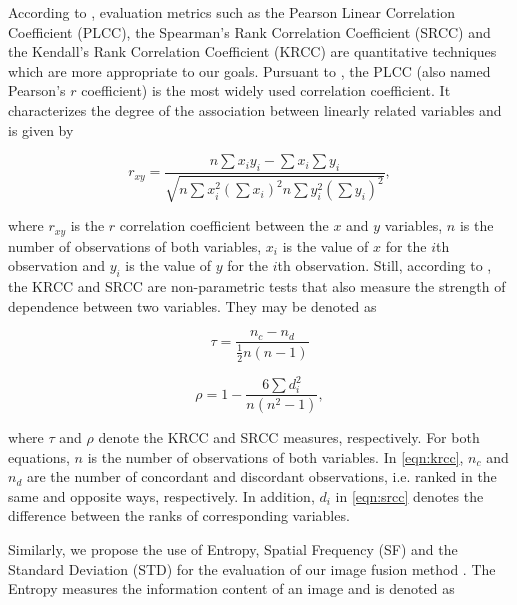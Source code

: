 According to , evaluation metrics such as the Pearson Linear Correlation Coefficient (PLCC), the Spearman's Rank Correlation Coefficient (SRCC) and the Kendall's Rank Correlation Coefficient (KRCC) are quantitative techniques which are more appropriate to our goals. Pursuant to , the PLCC (also named Pearson's $r$ coefficient) is the most widely used correlation coefficient. It characterizes the degree of the association between linearly related variables and is given by

\begin{equation}
\label{eqn:plcc}
r_{xy} = \frac{n \sum x_{i} y_{i} - \sum x_{i} \sum y_{i}}{\sqrt{n \sum x_{i}^{2} \left(\sum x_{i}\right)^{2} n \sum y_{i}^{2} \left(\sum y_{i}\right)^{2}}},
\end{equation}

\noindent where $r_{xy}$ is the $r$ correlation coefficient between the $x$ and $y$ variables, $n$ is the number of observations of both variables, $x_{i}$ is the value of $x$ for the $i$th observation and $y_{i}$ is the value of $y$ for the $i$th observation. Still, according to , the KRCC and SRCC are non-parametric tests that also measure the strength of dependence between two variables. They may be denoted as

\begin{equation}
\label{eqn:krcc}
\tau = \frac{n_{c} - n_{d}}{\frac{1}{2} n \left(n-1 \right)}
\end{equation}

\begin{equation}
\label{eqn:srcc}
\rho = 1 - \frac{6 \sum d_{i}^{2}}{n \left(n^{2}-1 \right)},
\end{equation}

\noindent where $\tau$ and $\rho$ denote the KRCC and SRCC measures, respectively. For both equations, $n$ is the number of observations of both variables. In \autoref{eqn:krcc}, $n_{c}$ and $n_{d}$ are the number of concordant and discordant observations, i.e. ranked in the same and opposite ways, respectively. In addition, $d_{i}$ in \autoref{eqn:srcc} denotes the difference between the ranks of corresponding variables.

Similarly, we propose the use of Entropy, Spatial Frequency (SF) and the Standard Deviation (STD) for the evaluation of our image fusion method \cite{naidu2008pixel}. The Entropy measures the information content of an image and is denoted as

